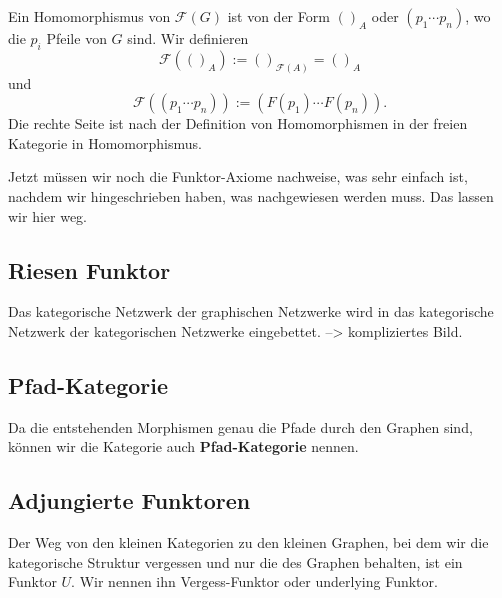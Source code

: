 \documentclass[a4paper]{amsart}
\theoremstyle{definition}
\newcommand{\FF}{\ensuremath{\mathcal{ F }}}
\begin{document}
Ein Homomorphismus von $\FF(G)$ ist von der Form $()_A$ oder $(p_1 \cdots p_n)$, wo die $p_i$ Pfeile von $G$ sind. Wir definieren
\begin{equation}\label{freiIdentitaet}
   \FF(()_A) := ()_{\FF(A)} = ()_A
\end{equation}
und
\begin{equation}
   \FF((p_1 \cdots p_n)) := (F(p_1) \cdots F(p_n)).
\end{equation}
Die rechte Seite ist nach der Definition von Homomorphismen in der freien Kategorie in Homomorphismus.

Jetzt müssen wir noch die Funktor-Axiome nachweise, was sehr einfach ist, nachdem wir hingeschrieben haben, was nachgewiesen werden muss. Das lassen wir hier weg.

\subsection{Riesen Funktor}
Das kategorische Netzwerk der graphischen Netzwerke wird in das kategorische Netzwerk der kategorischen Netzwerke eingebettet. --> kompliziertes Bild.

\subsection{Pfad-Kategorie}
Da die entstehenden Morphismen genau die Pfade durch den Graphen sind, können wir die Kategorie auch \textbf{Pfad-Kategorie} nennen.

\subsection{Adjungierte Funktoren}
Der Weg von den kleinen Kategorien zu den kleinen Graphen, bei dem wir die kategorische Struktur vergessen und nur die des Graphen behalten, ist ein Funktor $U$. Wir nennen ihn Vergess-Funktor oder underlying Funktor.
\end{document}
